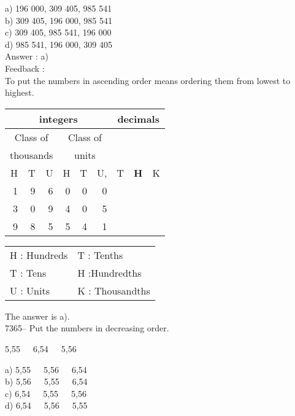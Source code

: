 \documentclass[letterpaper, 12pt]{article}
\begin{document}
a) 196 000, 309 405, 985 541\\
b) 309 405, 196 000, 985 541\\
c) 309 405, 985 541, 196 000\\
d) 985 541, 196 000, 309 405\\

Answer : a)\\

Feedback :\\
To put the numbers in ascending order means ordering them from lowest to highest.\\
\begin{center}
\begin{tabular}{|rrr|rrr|rrr|}
\hline
\multicolumn{6}{|c|}{integers} &\multicolumn{3}{|c|}{decimals} \\
\hline
\multicolumn{3}{|c|}{Class of} &\multicolumn{3}{|c|}{Class of} &  \multicolumn{3}{c|}{} \\
\multicolumn{3}{|c|}{thousands} &\multicolumn{3}{|c|}{units} &  \multicolumn{3}{c|}{} \\
\hline
H & T & U &H & T & U, & T\up{th} & \textbf{H\up{th}} & K\up{th} \\
\hline
\hline
1 & 9 & 6 & 0 & 0 & 0 & & &\\
3 & 0 & 9 & 4 & 0 & 5 & & &\\
9 & 8 & 5 & 5 & 4 & 1 & & &\\
\hline
\end{tabular}
\end{center}

\scriptsize
\begin{center}
\begin{tabular}{ll}
H : Hundreds & T\up{th} : Tenths\\
T : Tens & H\up{th} :Hundredths\\
U : Units & K\up{e} : Thousandths\\
\end{tabular}
\end{center}

\normalsize
The answer is a).\\


7365-- Put the numbers in decreasing order.\\ 
\begin{center}
5,55\ \ \ 6,54\ \ \ 5,56\\
\end{center}

a) 5,55\ \ \ 5,56\ \ \ 6,54\\
b) 5,56\ \ \ 5,55\ \ \ 6,54\\
c) 6,54\ \ \ 5,55\ \ \ 5,56\\
d) 6,54\ \ \ 5,56\ \ \ 5,55\\
\end{document}
